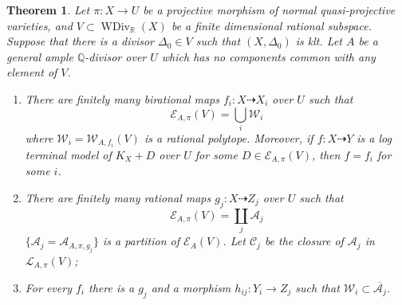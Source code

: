 \documentclass[11pt]{amsart}
\newtheorem{thm}[defn]{Theorem}
\begin{document}
\begin{thm}\label{finitemodel}
\cite[Corollary 1.1.5]{BCHM10} Let $\pi:X\to U$ be a projective morphism of normal quasi-projective varieties,  and $V \subset \operatorname{WDiv}_{\mathbb{R}}(X)$ be a finite dimensional rational subspace. Suppose that there is a divisor $\Delta_{0} \in V$ such that $(X,\Delta_{0})$ is klt. Let $A$ be a general ample $\mathbb{Q}$-divisor over $U$ which has no components common with any element of $V$.  
  \begin{enumerate}
    \item   There are finitely many birational maps $f_{i}:X \dashrightarrow   X_{i}$ over $U$ such that 
      \[
        \mathcal{E}_{A,\pi}(V) =\bigcup_{i}\mathcal{W}_{i}
      \]
      where  $\mathcal{W}_{i}=\mathcal{W}_{A,f_{i}}(V)$ is a rational polytope. Moreover, if  $f:X \dashrightarrow  Y$ is a  log terminal model of $K_{X}+D$ over $U$ for some $D \in \mathcal{E}_{A,\pi}(V)$, then  $f=f_{i}$ for some $i$.  

    \item   There are finitely many rational maps $g_{j}:X \dashrightarrow  Z_{j}$ over $U$ such that
      \[
        \mathcal{E}_{A,\pi}(V) =\coprod_{j}\mathcal{A}_{j}
      \]
      $ \{\mathcal{A}_j=\mathcal{A}_{A,\pi,g_j}\} $ is a partition of $ \mathcal{E}_{A}(V) $. Let $\mathcal{C}_{j}$ be the closure of $\mathcal{A}_{j}$ in $\mathcal{L}_{A,\pi}(V)$;
    \item  For every  $f_{i}$ there is a $g_{j}$ and a morphism $h_{ij}:Y_{i}\to Z_{j}$ such that $\mathcal{W}_{i} \subset \overline{\mathcal{A}_{j}}$.   
  \end{enumerate}
\end{thm}
\end{document}
